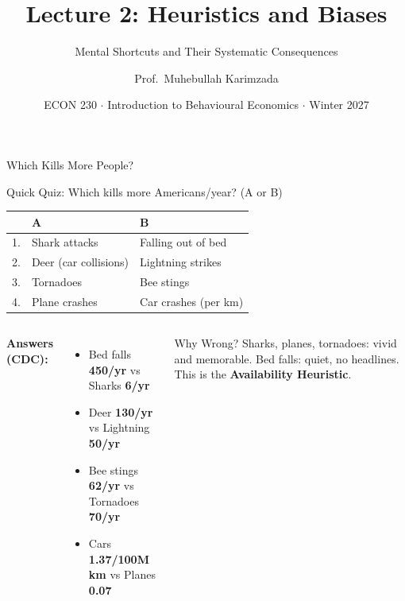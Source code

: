 \documentclass[aspectratio=169]{beamer}
\title{\textbf{Lecture 2: Heuristics and Biases}}
\subtitle{Mental Shortcuts and Their Systematic Consequences}
\author{Prof.\ Muhebullah Karimzada}
\institute{School of Economics, University of Northern British Columbia}
\date{ECON 230 $\cdot$ Introduction to Behavioural Economics $\cdot$ Winter 2027}
\begin{document}
\begin{frame}[plain]\titlepage\end{frame}

\begin{frame}{Which Kills More People?}
\begin{alertblock}{Quick Quiz: Which kills more Americans/year? (A or B)}
\small\begin{tabular}{lll}
& \textbf{A} & \textbf{B}\\
\midrule
1. & Shark attacks & Falling out of bed\\
2. & Deer (car collisions) & Lightning strikes\\
3. & Tornadoes & Bee stings\\
4. & Plane crashes & Car crashes (per km)\\
\end{tabular}
\end{alertblock}
\pause
\begin{columns}
\textcolor{beblue}{\textbf{Answers (CDC):}}\small
\begin{itemize}\itemsep0pt
  \item Bed falls \textbf{450/yr} vs Sharks \textbf{6/yr}
  \item Deer \textbf{130/yr} vs Lightning \textbf{50/yr}
  \item Bee stings \textbf{62/yr} vs Tornadoes \textbf{70/yr}
  \item Cars \textbf{1.37/100M km} vs Planes \textbf{0.07}
\end{itemize}
\begin{exampleblock}{Why Wrong?}
Sharks, planes, tornadoes: \alert{vivid and memorable}. Bed falls: quiet, no headlines. This is the \textbf{Availability Heuristic}.
\end{exampleblock}
\end{columns}
\end{frame}
\end{document}
